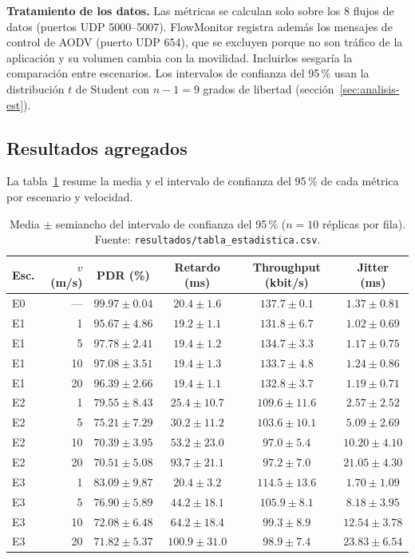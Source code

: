 \textbf{Tratamiento de los datos.} Las métricas se calculan solo sobre los 8 flujos de
datos (puertos UDP 5000--5007). FlowMonitor registra además los mensajes de control de
AODV (puerto UDP 654), que se excluyen porque no son tráfico de la aplicación y su
volumen cambia con la movilidad. Incluirlos sesgaría la comparación entre escenarios. Los
intervalos de confianza del 95\,\% usan la distribución $t$ de Student con $n - 1 = 9$
grados de libertad (sección~\ref{sec:analisis-est}).

\subsection{Resultados agregados}

La tabla~\ref{tab:resultados} resume la media y el intervalo de confianza del 95\,\% de
cada métrica por escenario y velocidad.

\begin{table}[h]
\centering
\small
\setlength{\tabcolsep}{4pt}
\begin{tabular}{lrcccc}
\toprule
\textbf{Esc.} & \textbf{$v$ (m/s)} & \textbf{PDR (\%)} & \textbf{Retardo (ms)} &
\textbf{Throughput (kbit/s)} & \textbf{Jitter (ms)} \\
\midrule
E0 & --- & $99.97 \pm 0.04$ & $20.4 \pm 1.6$ & $137.7 \pm 0.1$ & $1.37 \pm 0.81$ \\
\midrule
E1 & 1  & $95.67 \pm 4.86$ & $19.2 \pm 1.1$ & $131.8 \pm 6.7$ & $1.02 \pm 0.69$ \\
E1 & 5  & $97.78 \pm 2.41$ & $19.4 \pm 1.2$ & $134.7 \pm 3.3$ & $1.17 \pm 0.75$ \\
E1 & 10 & $97.08 \pm 3.51$ & $19.4 \pm 1.3$ & $133.7 \pm 4.8$ & $1.24 \pm 0.86$ \\
E1 & 20 & $96.39 \pm 2.66$ & $19.4 \pm 1.1$ & $132.8 \pm 3.7$ & $1.19 \pm 0.71$ \\
\midrule
E2 & 1  & $79.55 \pm 8.43$ & $25.4 \pm 10.7$ & $109.6 \pm 11.6$ & $2.57 \pm 2.52$ \\
E2 & 5  & $75.21 \pm 7.29$ & $30.2 \pm 11.2$ & $103.6 \pm 10.1$ & $5.09 \pm 2.69$ \\
E2 & 10 & $70.39 \pm 3.95$ & $53.2 \pm 23.0$ & $97.0 \pm 5.4$ & $10.20 \pm 4.10$ \\
E2 & 20 & $70.51 \pm 5.08$ & $93.7 \pm 21.1$ & $97.2 \pm 7.0$ & $21.05 \pm 4.30$ \\
\midrule
E3 & 1  & $83.09 \pm 9.87$ & $20.4 \pm 3.2$ & $114.5 \pm 13.6$ & $1.70 \pm 1.09$ \\
E3 & 5  & $76.90 \pm 5.89$ & $44.2 \pm 18.1$ & $105.9 \pm 8.1$ & $8.18 \pm 3.95$ \\
E3 & 10 & $72.08 \pm 6.48$ & $64.2 \pm 18.4$ & $99.3 \pm 8.9$ & $12.54 \pm 3.78$ \\
E3 & 20 & $71.82 \pm 5.37$ & $100.9 \pm 31.0$ & $98.9 \pm 7.4$ & $23.83 \pm 6.54$ \\
\bottomrule
\end{tabular}
\caption{Media $\pm$ semiancho del intervalo de confianza del 95\,\% ($n = 10$
réplicas por fila). Fuente: \texttt{resultados/tabla\_estadistica.csv}.}
\label{tab:resultados}
\end{table}

